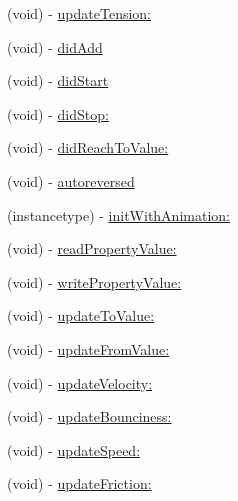 \begin{DoxyCompactItemize}
\item 
(void) -\/ \mbox{\hyperlink{category_p_o_p_animation_tracer_07_internal_08_a5010bbc6fa2ec5426d33706651e584de}{update\+Tension\+:}}
\item 
(void) -\/ \mbox{\hyperlink{category_p_o_p_animation_tracer_07_internal_08_ad853415c050d51eea5ca62c154e9e94a}{did\+Add}}
\item 
(void) -\/ \mbox{\hyperlink{category_p_o_p_animation_tracer_07_internal_08_a91b472c0e05c912fe9d05e2e9de17f9f}{did\+Start}}
\item 
(void) -\/ \mbox{\hyperlink{category_p_o_p_animation_tracer_07_internal_08_aa97d51350238303c671157f782583a9b}{did\+Stop\+:}}
\item 
(void) -\/ \mbox{\hyperlink{category_p_o_p_animation_tracer_07_internal_08_a03287c5af7d17de6143c7dcc0ac56251}{did\+Reach\+To\+Value\+:}}
\item 
(void) -\/ \mbox{\hyperlink{category_p_o_p_animation_tracer_07_internal_08_a641c94b868612f3d5b92b24cc4098517}{autoreversed}}
\item 
(instancetype) -\/ \mbox{\hyperlink{category_p_o_p_animation_tracer_07_internal_08_a172bb65bdc4887fc5bfe4bcd38e5a5e8}{init\+With\+Animation\+:}}
\item 
(void) -\/ \mbox{\hyperlink{category_p_o_p_animation_tracer_07_internal_08_a219ed8a35e2d3fa997e5688386572f15}{read\+Property\+Value\+:}}
\item 
(void) -\/ \mbox{\hyperlink{category_p_o_p_animation_tracer_07_internal_08_aa703f72cf374b9f6feb44c0fe8d508d9}{write\+Property\+Value\+:}}
\item 
(void) -\/ \mbox{\hyperlink{category_p_o_p_animation_tracer_07_internal_08_a00d4c0e1b6b446081cfb6c153f37a633}{update\+To\+Value\+:}}
\item 
(void) -\/ \mbox{\hyperlink{category_p_o_p_animation_tracer_07_internal_08_aa5cc867da95a73d3254f38a86281233a}{update\+From\+Value\+:}}
\item 
(void) -\/ \mbox{\hyperlink{category_p_o_p_animation_tracer_07_internal_08_ab828c06696377e94ba3bdd490b5cd146}{update\+Velocity\+:}}
\item 
(void) -\/ \mbox{\hyperlink{category_p_o_p_animation_tracer_07_internal_08_a61998b16b4eb5df6d11dbd0bd269339c}{update\+Bounciness\+:}}
\item 
(void) -\/ \mbox{\hyperlink{category_p_o_p_animation_tracer_07_internal_08_a7f31ab4b95f8d9409a77b78bf7b8af1d}{update\+Speed\+:}}
\item 
(void) -\/ \mbox{\hyperlink{category_p_o_p_animation_tracer_07_internal_08_aba012bff58a203420d1adf3e922491e0}{update\+Friction\+:}}

\end{DoxyCompactItemize}
